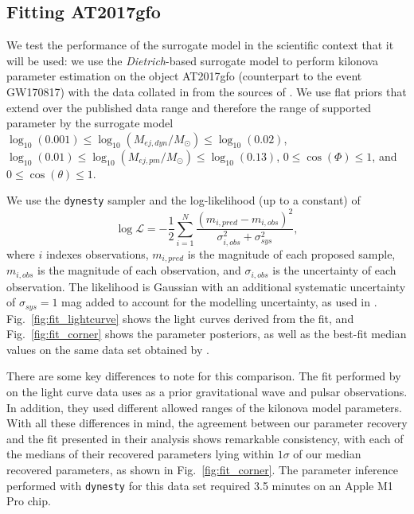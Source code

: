 \documentclass[fleqn,usenatbib,useAMS]{mnras}
\begin{document}
\subsection{Fitting AT2017gfo}
We test the performance of the surrogate model in the scientific context that it will be used: we use the \emph{Dietrich}-based surrogate model to perform kilonova parameter estimation on the object AT2017gfo (counterpart to the event GW170817) with the data collated in \cite{coughlinConstraintsNeutronStar2018} from the sources of \citet{andreoniFollowGW170817Its2017, arcaviOpticalEmissionKilonova2017,chornockElectromagneticCounterpartBinary2017, cowperthwaiteElectromagneticCounterpartBinary2017,droutLightCurvesNeutron2017,evansSwiftNuSTARObservations2017,kasliwalIlluminatingGravitationalWaves2017,tanvirEmergenceLanthaniderichKilonova2017,pianSpectroscopicIdentificationRprocess2017,trojaXrayCounterpartGravitationalwave2017,smarttKilonovaElectromagneticCounterpart2017,utsumiJGEMObservationsElectromagnetic2017}.
We use flat priors that extend over the published data range and therefore the range of supported parameter by the surrogate model $\log_{10}(0.001) \leq \log_{10}(M_{ej, dyn} / M_{\odot}) \leq \log_{10}(0.02)$, $\log_{10}(0.01) \leq \log_{10}(M_{ej, pm} / M_{\odot}) \leq \log_{10}(0.13)$, $0 \leq \cos (\Phi) \leq 1$, and $0 \leq \cos (\theta) \leq 1$.

We use the \texttt{dynesty} sampler and the log-likelihood (up to a constant) of
\begin{equation}
    \log\mathcal{L} = -\frac{1}{2} \sum_{i=1}^N \frac{(m_{i, pred} - m_{i, obs})^2}{\sigma_{i, obs}^2 + \sigma_{ sys}^2},
    \label{eq:lklhd}
\end{equation}
\noindent where $i$ indexes observations, $m_{i,pred}$ is the magnitude of each proposed sample, $m_{i,obs}$ is the magnitude of each observation, and $\sigma_{i,obs}$ is the uncertainty of each observation. 
The likelihood is Gaussian with an additional systematic uncertainty of $\sigma_{sys}=1$ mag added to account for the modelling uncertainty, as used in \cite{coughlinConstraintsNeutronStar2018}. 
Fig.~\ref{fig:fit_lightcurve} shows the light curves derived from the fit, and Fig.~\ref{fig:fit_corner} shows the parameter posteriors, as well as the best-fit median values on the same data set obtained by \cite{dietrichMultimessengerConstraintsNeutronstar2020}. 

There are some key differences to note for this comparison.
The fit performed by \cite{dietrichMultimessengerConstraintsNeutronstar2020} on the light curve data uses as a prior gravitational wave and pulsar observations. 
In addition, they used different allowed ranges of the kilonova model parameters.
With all these differences in mind, the agreement between our parameter recovery and the fit presented in their analysis shows remarkable consistency, with each of the medians of their recovered parameters lying within $1 \sigma$ of our median recovered parameters, as shown in Fig.~\ref{fig:fit_corner}. 
The parameter inference performed with \texttt{dynesty} for this data set required 3.5 minutes on an Apple M1 Pro chip.
\end{document}
